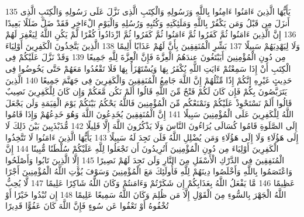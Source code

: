 {\tiny\colorbox{cl_aya}{135}} يَأَيُّهَا الَّذِينَ ءَامَنُوا ءَامِنُوا بِاللَّهِ وَرَسُولِهِ وَالْكِتَبِ الَّذِى نَزَّلَ عَلَى رَسُولِهِ وَالْكِتَبِ الَّذِى أَنزَلَ مِن قَبْلُ وَمَن يَكْفُرْ بِاللَّهِ وَمَلَئِكَتِهِ وَكُتُبِهِ وَرُسُلِهِ وَالْيَوْمِ الْءَاخِرِ فَقَدْ ضَلَّ ضَلَلًا بَعِيدًا
{\tiny\colorbox{cl_aya}{136}} إِنَّ الَّذِينَ ءَامَنُوا ثُمَّ كَفَرُوا ثُمَّ ءَامَنُوا ثُمَّ كَفَرُوا ثُمَّ ازْدَادُوا كُفْرًا لَّمْ يَكُنِ اللَّهُ لِيَغْفِرَ لَهُمْ وَلَا لِيَهْدِيَهُمْ سَبِيلًا
{\tiny\colorbox{cl_aya}{137}} بَشِّرِ الْمُنَفِقِينَ بِأَنَّ لَهُمْ عَذَابًا أَلِيمًا
{\tiny\colorbox{cl_aya}{138}} الَّذِينَ يَتَّخِذُونَ الْكَفِرِينَ أَوْلِيَاءَ مِن دُونِ الْمُؤْمِنِينَ أَيَبْتَغُونَ عِندَهُمُ الْعِزَّةَ فَإِنَّ الْعِزَّةَ لِلَّهِ جَمِيعًا
{\tiny\colorbox{cl_aya}{139}} وَقَدْ نَزَّلَ عَلَيْكُمْ فِى الْكِتَبِ أَنْ إِذَا سَمِعْتُمْ ءَايَتِ اللَّهِ يُكْفَرُ بِهَا وَيُسْتَهْزَأُ بِهَا فَلَا تَقْعُدُوا مَعَهُمْ حَتَّى يَخُوضُوا فِى حَدِيثٍ غَيْرِهِ إِنَّكُمْ إِذًا مِّثْلُهُمْ إِنَّ اللَّهَ جَامِعُ الْمُنَفِقِينَ وَالْكَفِرِينَ فِى جَهَنَّمَ جَمِيعًا
{\tiny\colorbox{cl_aya}{140}} الَّذِينَ يَتَرَبَّصُونَ بِكُمْ فَإِن كَانَ لَكُمْ فَتْحٌ مِّنَ اللَّهِ قَالُوا أَلَمْ نَكُن مَّعَكُمْ وَإِن كَانَ لِلْكَفِرِينَ نَصِيبٌ قَالُوا أَلَمْ نَسْتَحْوِذْ عَلَيْكُمْ وَنَمْنَعْكُم مِّنَ الْمُؤْمِنِينَ فَاللَّهُ يَحْكُمُ بَيْنَكُمْ يَوْمَ الْقِيَمَةِ وَلَن يَجْعَلَ اللَّهُ لِلْكَفِرِينَ عَلَى الْمُؤْمِنِينَ سَبِيلًا
{\tiny\colorbox{cl_aya}{141}} إِنَّ الْمُنَفِقِينَ يُخَدِعُونَ اللَّهَ وَهُوَ خَدِعُهُمْ وَإِذَا قَامُوا إِلَى الصَّلَوةِ قَامُوا كُسَالَى يُرَاءُونَ النَّاسَ وَلَا يَذْكُرُونَ اللَّهَ إِلَّا قَلِيلًا
{\tiny\colorbox{cl_aya}{142}} مُّذَبْذَبِينَ بَيْنَ ذَلِكَ لَا إِلَى هَؤُلَاءِ وَلَا إِلَى هَؤُلَاءِ وَمَن يُضْلِلِ اللَّهُ فَلَن تَجِدَ لَهُ سَبِيلًا
{\tiny\colorbox{cl_aya}{143}} يَأَيُّهَا الَّذِينَ ءَامَنُوا لَا تَتَّخِذُوا الْكَفِرِينَ أَوْلِيَاءَ مِن دُونِ الْمُؤْمِنِينَ أَتُرِيدُونَ أَن تَجْعَلُوا لِلَّهِ عَلَيْكُمْ سُلْطَنًا مُّبِينًا
{\tiny\colorbox{cl_aya}{144}} إِنَّ الْمُنَفِقِينَ فِى الدَّرْكِ الْأَسْفَلِ مِنَ النَّارِ وَلَن تَجِدَ لَهُمْ نَصِيرًا
{\tiny\colorbox{cl_aya}{145}} إِلَّا الَّذِينَ تَابُوا وَأَصْلَحُوا وَاعْتَصَمُوا بِاللَّهِ وَأَخْلَصُوا دِينَهُمْ لِلَّهِ فَأُولَئِكَ مَعَ الْمُؤْمِنِينَ وَسَوْفَ يُؤْتِ اللَّهُ الْمُؤْمِنِينَ أَجْرًا عَظِيمًا
{\tiny\colorbox{cl_aya}{146}} مَّا يَفْعَلُ اللَّهُ بِعَذَابِكُمْ إِن شَكَرْتُمْ وَءَامَنتُمْ وَكَانَ اللَّهُ شَاكِرًا عَلِيمًا
{\tiny\colorbox{cl_aya}{147}} لَّا يُحِبُّ اللَّهُ الْجَهْرَ بِالسُّوءِ مِنَ الْقَوْلِ إِلَّا مَن ظُلِمَ وَكَانَ اللَّهُ سَمِيعًا عَلِيمًا
{\tiny\colorbox{cl_aya}{148}} إِن تُبْدُوا خَيْرًا أَوْ تُخْفُوهُ أَوْ تَعْفُوا عَن سُوءٍ فَإِنَّ اللَّهَ كَانَ عَفُوًّا قَدِيرًا
